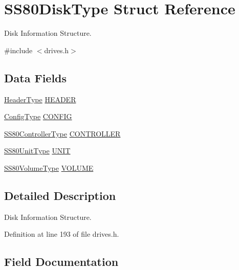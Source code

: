 \hypertarget{structSS80DiskType}{}\section{S\+S80\+Disk\+Type Struct Reference}
\label{structSS80DiskType}


Disk Information Structure.  




{\ttfamily \#include $<$drives.\+h$>$}

\subsection*{Data Fields}
\begin{DoxyCompactItemize}
\item 
\hyperlink{structHeaderType}{Header\+Type} \hyperlink{structSS80DiskType_ae66c0130dee8c362743dfdfc41539c3b}{H\+E\+A\+D\+ER}
\item 
\hyperlink{structConfigType}{Config\+Type} \hyperlink{structSS80DiskType_aeff2b9e1dcd95310e9e8dee63a60ed95}{C\+O\+N\+F\+IG}
\item 
\hyperlink{structSS80ControllerType}{S\+S80\+Controller\+Type} \hyperlink{structSS80DiskType_ae9da84cba5786cf755c388eba065c0cd}{C\+O\+N\+T\+R\+O\+L\+L\+ER}
\item 
\hyperlink{structSS80UnitType}{S\+S80\+Unit\+Type} \hyperlink{structSS80DiskType_ac630da1440afd60d726c7c41eb7b990c}{U\+N\+IT}
\item 
\hyperlink{structSS80VolumeType}{S\+S80\+Volume\+Type} \hyperlink{structSS80DiskType_adef69576dbc48a5d70ff628578d77b60}{V\+O\+L\+U\+ME}
\end{DoxyCompactItemize}


\subsection{Detailed Description}
Disk Information Structure. 

Definition at line 193 of file drives.\+h.



\subsection{Field Documentation}
\mbox{\label{structSS80DiskType_aeff2b9e1dcd95310e9e8dee63a60ed95}} 
